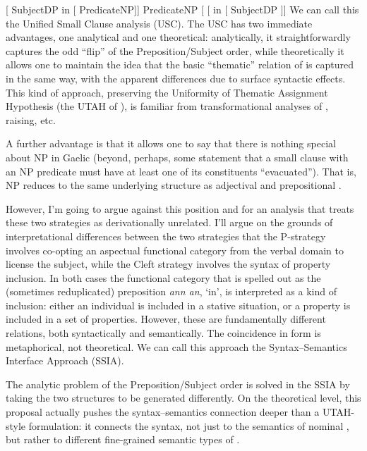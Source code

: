 \documentclass[output=paper]{langsci/langscibook}
\begin{document}
\ea
    \ea {}[ SubjectDP in [  PredicateNP]]
    \ex PredicateNP [ [ in [ SubjectDP ]]
    \z
\z
We can call this the Unified Small Clause analysis (USC). The USC has two
immediate advantages, one analytical and one theoretical: analytically, it
straightforwardly captures the odd ``flip'' of the Preposition/Subject order,
while theoretically it allows one to maintain the idea that the basic
``thematic'' relation of  is captured in the same way, with
the apparent differences due to surface syntactic effects. This kind of
approach, preserving the Uniformity of Thematic Assignment Hypothesis (the UTAH
of \citealt{baker88}), is familiar from transformational analyses of ,
raising, etc.

A further advantage is that it allows one to say that there is nothing special
about NP  in Gaelic (beyond, perhaps, some statement that a small
clause with an NP predicate must have at least one of its constituents
``evacuated''). That is, NP  reduces to the same underlying structure
as adjectival and prepositional .

However, I'm going to argue against this position and for an analysis that
treats these two strategies as derivationally unrelated. I'll argue on the
grounds of interpretational differences between the two strategies that the
P-strategy involves co-opting an aspectual functional category from the verbal
domain to license the subject, while the Cleft strategy involves the syntax of
property inclusion. In both cases the functional category that is spelled out
as the (sometimes reduplicated) preposition \emph{ann an}, `in', is interpreted
as a kind of inclusion: either an individual is included in a stative
situation, or a property is included in a set of properties. However, these are
fundamentally different relations, both syntactically and semantically. The
coincidence in form is metaphorical, not theoretical. We can call this approach
the Syntax--Semantics Interface Approach (SSIA).

The analytic problem of the Preposition/Subject order is solved in the SSIA by
taking the two structures to be generated differently. On the theoretical
level, this proposal actually pushes the syntax--semantics connection deeper
than a UTAH-style formulation: it connects the syntax, not just to the
semantics of nominal , but rather to different fine-grained semantic
types of .
\end{document}
